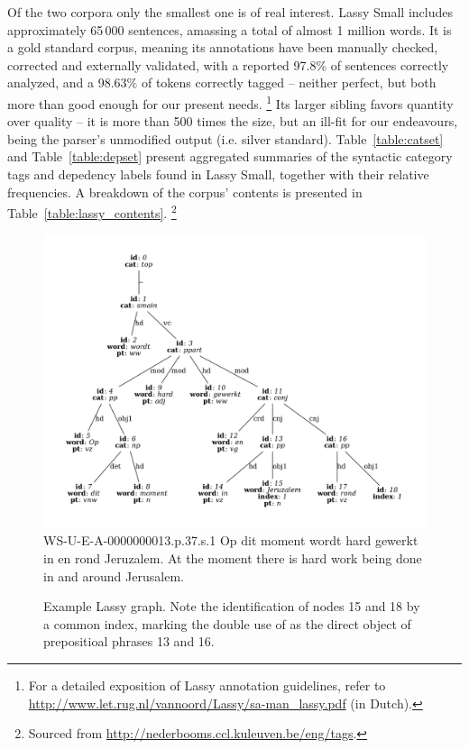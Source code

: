 Of the two corpora only the smallest one is of real interest.
Lassy Small includes approximately 65\,000 sentences, amassing a total of almost 1 million words. 
It is a gold standard corpus, meaning its annotations have been manually checked, corrected and externally validated, with a reported 97.8\% of sentences correctly analyzed, and a 98.63\% of tokens correctly tagged -- neither perfect, but both more than good enough for our present needs.%
	\footnote{For a detailed exposition of Lassy annotation guidelines, refer to \url{http://www.let.rug.nl/vannoord/Lassy/sa-man_lassy.pdf} (in Dutch).}
Its larger sibling favors quantity over quality -- it is more than 500 times the size, but an ill-fit for our endeavours, being the parser's unmodified output (i.e. silver standard).
Table~\ref{table:catset} and Table~\ref{table:depset} present aggregated summaries of the syntactic category tags and depedency labels found in Lassy Small, together with their relative frequencies. 
A breakdown of the corpus' contents is presented in Table~\ref{table:lassy_contents}.%
\footnote{Sourced from \url{http://nederbooms.ccl.kuleuven.be/eng/tags}.}

\begin{figure}
	\includegraphics[width=1\textwidth,trim={1.25cm 0 1.25cm 0}, clip]{./prebuilt/parse_example.pdf}
	\lassycap
		{WS-U-E-A-0000000013.p.37.s.1}
		{Op dit moment wordt hard gewerkt in en rond Jeruzalem.}
		{At the moment there is hard work being done in and around Jerusalem.}
	\caption{Example Lassy graph. Note the identification of nodes 15 and 18 by a common index, marking the double use of  as the direct object of prepositioal phrases 13 and 16.}
	\label{figure:example_lassy_tree}
\end{figure}

